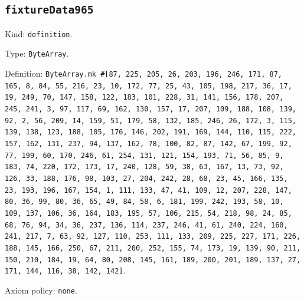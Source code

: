 \documentclass[11pt]{article}
\begin{document}
\subsection*{\texttt{fixtureData965}}
\noindent Kind: \texttt{definition}.\par
\noindent Type: \texttt{ByteArray}.\par
\noindent Definition: \texttt{ByteArray.mk \#[87, 225, 205, 26, 203, 196, 246, 171, 87, 165, 8, 84, 55, 216, 23, 10, 172, 77, 25, 43, 105, 198, 217, 36, 17, 19, 249, 70, 147, 158, 122, 183, 101, 228, 31, 141, 156, 178, 207, 245, 241, 3, 97, 117, 69, 162, 130, 157, 17, 207, 109, 188, 108, 139, 92, 2, 56, 209, 14, 159, 51, 179, 58, 132, 185, 246, 26, 172, 3, 115, 139, 138, 123, 188, 105, 176, 146, 202, 191, 169, 144, 110, 115, 222, 157, 162, 131, 237, 94, 137, 162, 78, 100, 82, 87, 142, 67, 199, 92, 77, 199, 60, 170, 246, 61, 254, 131, 121, 154, 193, 71, 56, 85, 9, 183, 74, 220, 172, 173, 17, 240, 128, 59, 38, 63, 167, 13, 73, 92, 126, 33, 188, 176, 98, 103, 27, 204, 242, 28, 68, 23, 45, 166, 135, 23, 193, 196, 167, 154, 1, 111, 133, 47, 41, 109, 12, 207, 228, 147, 80, 36, 99, 80, 36, 65, 49, 84, 58, 6, 181, 199, 242, 193, 58, 10, 109, 137, 106, 36, 164, 183, 195, 57, 106, 215, 54, 218, 98, 24, 85, 68, 76, 94, 34, 36, 237, 136, 114, 237, 246, 41, 61, 240, 224, 160, 241, 217, 7, 63, 92, 127, 110, 253, 111, 133, 209, 225, 227, 171, 226, 188, 145, 166, 250, 67, 211, 200, 252, 155, 74, 173, 19, 139, 90, 211, 150, 210, 184, 19, 64, 80, 208, 145, 161, 189, 200, 201, 189, 137, 27, 171, 144, 116, 38, 142, 142]}.\par
\noindent Axiom policy: \texttt{none}.\par
\end{document}
